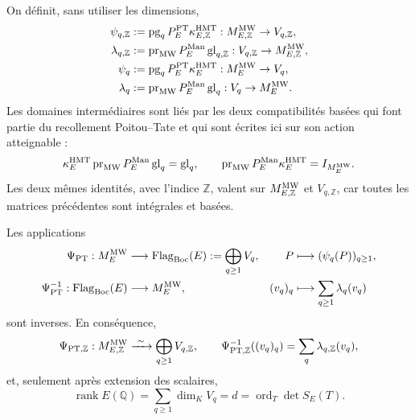 On définit, sans utiliser les dimensions,
\begin{equation}\label{eq:pdf2-bsd-psi-y-lambda-q}
 \begin{aligned}
  \psi_{q,\mathbb Z}&:=
      \operatorname{pg}_qP_E^{\rm PT}\kappa_{E,\mathbb Z}^{\rm HMT}:
      M_{E,\mathbb Z}^{\rm MW}\to V_{q,\mathbb Z},\\
  \lambda_{q,\mathbb Z}&:=
      \operatorname{pr}_{\rm MW}P_E^{\rm Man}
      \operatorname{gl}_{q,\mathbb Z}:
      V_{q,\mathbb Z}\to M_{E,\mathbb Z}^{\rm MW},\\
  \psi_q&:=\operatorname{pg}_qP_E^{\rm PT}\kappa_E^{\rm HMT}:
      M_E^{\rm MW}\to V_q,\\
  \lambda_q&:=\operatorname{pr}_{\rm MW}P_E^{\rm Man}
      \operatorname{gl}_q:V_q\to M_E^{\rm MW}.
 \end{aligned}
\end{equation}
Les domaines intermédiaires sont liés par les deux compatibilités basées
qui font partie du recollement Poitou--Tate et qui sont écrites ici sur son
action atteignable :
\begin{equation}\label{eq:pdf2-bsd-kummer-glue-compatibilidad}
 \kappa_E^{\rm HMT}\operatorname{pr}_{\rm MW}P_E^{\rm Man}
       \operatorname{gl}_q=\operatorname{gl}_q,
 \qquad
 \operatorname{pr}_{\rm MW}P_E^{\rm Man}\kappa_E^{\rm HMT}
       =I_{M_E^{\rm MW}}.
\end{equation}
Les deux mêmes identités, avec l'indice $\mathbb Z$, valent sur
$M_{E,\mathbb Z}^{\rm MW}$ et $V_{q,\mathbb Z}$, car toutes les matrices
précédentes sont intégrales et basées.

\begin{theorem}
\label{thm:pdf2-bsd-psi-pt}
Les applications
\begin{equation}\label{eq:pdf2-bsd-psi-pt}
 \begin{aligned}
 \Psi_{\rm PT}:M_E^{\rm MW}&\longrightarrow
       \operatorname{Flag}_{\rm Boc}(E):=\bigoplus_{q\ge1}V_q,
 &P&\longmapsto(\psi_q(P))_{q\ge1},\\
 \Psi_{\rm PT}^{-1}:\operatorname{Flag}_{\rm Boc}(E)&\longrightarrow M_E^{\rm MW},
 &(v_q)_q&\longmapsto\sum_{q\ge1}\lambda_q(v_q)
 \end{aligned}
\end{equation}
sont inverses. En conséquence,
\begin{equation}\label{eq:pdf2-bsd-psi-pt-integral}
 \Psi_{{\rm PT},\mathbb Z}:M_{E,\mathbb Z}^{\rm MW}
 \xrightarrow{\ \sim\ }\bigoplus_{q\ge1}V_{q,\mathbb Z},
 \qquad
 \Psi_{{\rm PT},\mathbb Z}^{-1}((v_q)_q)=
 \sum_q\lambda_{q,\mathbb Z}(v_q),
\end{equation}
et, seulement après extension des scalaires,
\begin{equation}\label{eq:pdf2-bsd-rango-orden}
 \operatorname{rank}E(\mathbb Q)
 =\sum_{q\ge1}\dim_K V_q
 =d=\operatorname{ord}_T\det S_E(T).
\end{equation}
\end{theorem}

